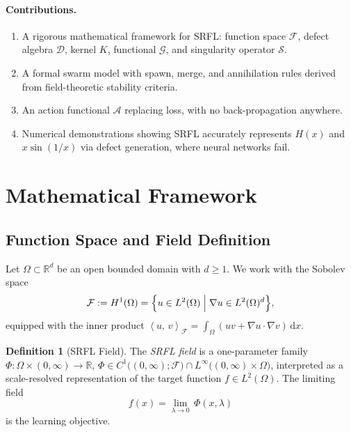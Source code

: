 \documentclass[12pt,a4paper]{article}
\theoremstyle{plain}
\theoremstyle{definition}
\newtheorem{definition}[theorem]{Definition}
\theoremstyle{remark}
\newcommand{\cF}{\mathcal{F}}
\newcommand{\cD}{\mathcal{D}}
\newcommand{\cG}{\mathcal{G}}
\newcommand{\cS}{\mathcal{S}}
\newcommand{\cA}{\mathcal{A}}
\newcommand{\R}{\mathbb{R}}
\newcommand{\inner}[2]{\left\langle#1,\,#2\right\rangle}
\newcommand{\dd}{\mathrm{d}}
\DeclarePairedDelimiter{\set}{\{}{\}}
\begin{document}
\paragraph{Contributions.}
\begin{enumerate}[label=\textbf{C\arabic*.}]
  \item A rigorous mathematical framework for SRFL: function space
    $\cF$, defect algebra $\cD$, kernel $K$, functional $\cG$,
    and singularity operator $\cS$.
  \item A formal swarm model with spawn, merge, and annihilation rules
    derived from field-theoretic stability criteria.
  \item An action functional $\cA$ replacing loss, with no
    back-propagation anywhere.
  \item Numerical demonstrations showing SRFL accurately represents
    $H(x)$ and $x\sin(1/x)$ via defect generation, where neural
    networks fail.
\end{enumerate}

\section{Mathematical Framework}
\label{sec:theory}

\subsection{Function Space and Field Definition}
\label{sec:theory:space}

Let $\Omega \subset \R^d$ be an open bounded domain with $d\geq 1$.
We work with the Sobolev space
\begin{equation}
  \cF := H^1(\Omega) = \set*{u \in L^2(\Omega) \;\Big|\; \nabla u \in L^2(\Omega)^d},
  \label{eq:sobolev}
\end{equation}
equipped with the inner product
$\inner{u}{v}_{\cF} = \int_\Omega (uv + \nabla u \cdot \nabla v)\,\dd x$.

\begin{definition}[SRFL Field]
  The \emph{SRFL field} is a one-parameter family
  $\Phi : \Omega \times (0,\infty) \to \R$,
  $\Phi \in C^1\bigl((0,\infty);\cF\bigr) \cap
             L^\infty\bigl((0,\infty)\times\Omega\bigr)$,
  interpreted as a scale-resolved representation of the target function
  $f \in L^2(\Omega)$.  The limiting field
  \begin{equation}
    f(x) = \lim_{\lambda \to 0}\, \Phi(x,\lambda)
    \label{eq:limit}
  \end{equation}
  is the learning objective.
\end{definition}
\end{document}
